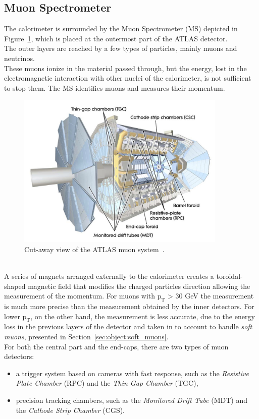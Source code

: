 \FloatBarrier
\subsection{Muon Spectrometer}
\label{sec:MuonSpec}
The calorimeter is surrounded by the Muon Spectrometer (MS) depicted in Figure~\ref{fig:MS}, which is placed at the outermost part of the ATLAS detector.\\
The outer layers are reached by a few types of particles, mainly muons and neutrinos.\\
These muons ionize  in the material passed through, but the energy, lost in the electromagnetic interaction
with other nuclei of the calorimeter, is not sufficient to stop them. 
The MS  identifies muons and measures their momentum.
\begin{figure}[h]
	\centering
	\includegraphics[width=10cm]{Chapters/CH2/figures/MS}
	\caption{Cut-away view of the ATLAS muon system~\cite{ATLAS}.}
	\label{fig:MS}
\end{figure}
\\A series of magnets arranged externally to the calorimeter creates a toroidal-shaped magnetic field that modifies the charged particles direction allowing the measurement of the momentum.
For muons with $\mathrm{p_T}$ > 30 GeV the measurement is much more precise than the measurement obtained by the inner detectors. 
For lower $\mathrm{p_T}$, on the other hand, the measurement is less accurate, due to the 
energy loss in the previous layers of the detector and taken in to account to handle \textit{soft muons}, presented in Section~\ref{sec:object:soft_muons}.\\
For both the central part and the end-caps,  there are two types of muon detectors:
\begin{itemize}
	\item a trigger system based on cameras with fast response, such as the \textit{Resistive Plate Chamber} (RPC) and the \textit{Thin Gap Chamber} (TGC), 
	\item precision tracking chambers, such as the \textit{Monitored Drift Tube} (MDT) and the \textit{Cathode Strip Chamber} (CGS).
\end{itemize}
